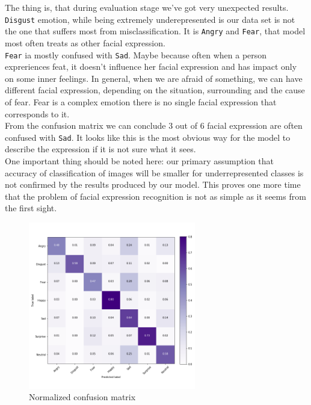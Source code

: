 The thing is, that during evaluation stage we've got very unexpected results. \texttt{Disgust} emotion, while being extremely underepresented is our data set is not the one that suffers most from misclassification. It is \texttt{Angry} and \texttt{Fear}, that model most often treats as other facial expression.\\

\texttt{Fear} ia mostly confused with  \texttt{Sad}. Maybe because often when a person expreriences feat, it doesn't influence her facial expression and has impact only on some inner feelings. In general, when we are afraid of something, we can have different facial expression, depending on the situation, surrounding and the cause of fear. Fear is a complex emotion there is no single facial expression that corresponds to it.\\

From the confusion matrix we can conclude 3 out of 6 facial expression are often confused with \texttt{Sad}. It looks like this is the most obvious way for the model to describe the expression if it is not sure what it sees.\\

One important thing should be noted here: our primary assumption that accuracy of classification of images will be smaller for underrepresented classes is not confirmed by the results produced by our model. This proves one more time that the problem of facial expression recognition is not as simple as it seems from the first sight.

\begin{figure}
	\centering
	\includegraphics[width=0.65\textwidth]{../images/confusion.png}
	\caption{Normalized confusion matrix}
\end{figure}

